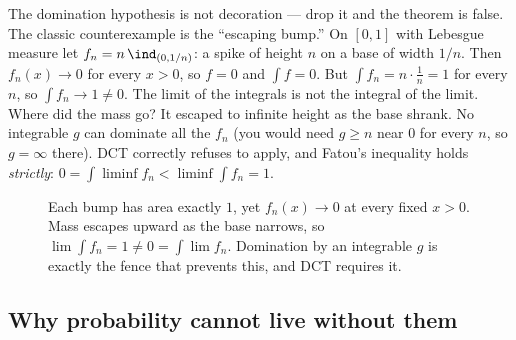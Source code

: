 \begin{trapbox}
The domination hypothesis is not decoration --- drop it and the theorem is
false. The classic counterexample is the ``escaping bump.'' On $[0,1]$ with
Lebesgue measure let $f_n = n\,\ind_{(0,1/n)}$: a spike of height $n$ on a base
of width $1/n$. Then $f_n(x)\to 0$ for every $x>0$, so $f=0$ and $\int f = 0$.
But $\int f_n = n\cdot\frac1n = 1$ for every $n$, so $\int f_n \to 1 \ne 0$. The
limit of the integrals is not the integral of the limit. Where did the mass go?
It escaped to infinite height as the base shrank. No integrable $g$ can dominate
all the $f_n$ (you would need $g\ge n$ near $0$ for every $n$, so $g=\infty$
there). DCT correctly refuses to apply, and Fatou's inequality holds
\emph{strictly}: $0 = \int\liminf f_n < \liminf\int f_n = 1$.
\end{trapbox}

\begin{figure}[H]
\centering
{}
\caption{Each bump has area exactly $1$, yet $f_n(x)\to 0$ at every fixed
$x>0$. Mass escapes upward as the base narrows, so $\lim\int f_n = 1 \ne 0 =
\int\lim f_n$. Domination by an integrable $g$ is exactly the fence that
prevents this, and DCT requires it.}
\label{ch37:fig-bump}
\end{figure}

\subsection{Why probability cannot live without them}

